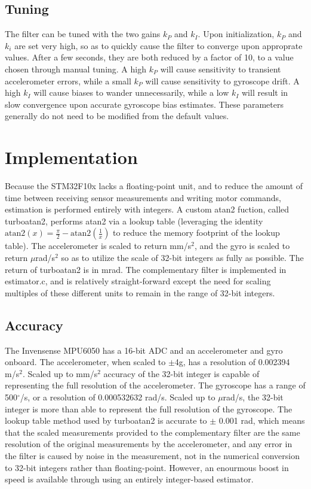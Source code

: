 \documentclass[paper=a4, fontsize=11pt]{scrartcl} %
\numberwithin{equation}{section} %
\numberwithin{figure}{section} %
\numberwithin{table}{section} %
\begin{document}
\subsection{Tuning}
The filter can be tuned with the two gains $k_P$ and $k_I$.  Upon initialization, $k_P$ and $k_i$ are set very high, so as to quickly cause the filter to converge upon approprate values.  After a few seconds, they are both reduced by a factor of 10, to a value chosen through manual tuning.  A high $k_P$ will cause sensitivity to transient accelerometer errors, while a small $k_P$ will cause sensitivity to gyroscope drift.  A high $k_I$ will cause biases to wander unnecessarily, while a low $k_I$ will result in slow convergence upon accurate gyroscope bias estimates.  These parameters generally do not need to be modified from the default values.

\section{Implementation}
Because the STM32F10x lacks a floating-point unit, and to reduce the amount of time between receiving sensor measurements and writing motor commands, estimation is performed entirely with integers.  A custom atan2 fuction, called turboatan2, performs atan2 via a lookup table (leveraging the identity $\textrm{atan2}(x) = \tfrac{\pi}{2} - \textrm{atan2}\left(\tfrac{1}{x}\right)$ to reduce the memory footprint of the lookup table).  The accelerometer is scaled to return mm/s$^2$, and the gyro is scaled to return $\mu$rad/s$^2$ so as to utilize the scale of 32-bit integers as fully as possible.  The return of turboatan2 is in mrad.  The complementary filter is implemented in estimator.c, and is relatively straight-forward except the need for scaling multiples of these different units to remain in the range of 32-bit integers.

\subsection{Accuracy}

The Invensense MPU6050 has a 16-bit ADC and an accelerometer and gyro onboard.  The accelerometer, when scaled to $\pm$4g, has a resolution of 0.002394 m/s$^2$.  Scaled up to mm/s$^2$ accuracy of the 32-bit integer is capable of representing the full resolution of the accelerometer.  The gyroscope has a range of 500$^\circ$/s, or a resolution of 0.000532632 rad/s.  Scaled up to $\mu$rad/s, the 32-bit integer is more than able to represent the full resolution of the gyroscope.  The lookup table method used by turboatan2 is accurate to $\pm$ 0.001 rad, which means that the scaled measurements provided to the complementary filter are the same resolution of the original measurements by the accelerometer, and any error in the filter is caused by noise in the measurement, not in the numerical conversion to 32-bit integers rather than floating-point.  However, an enourmous boost in speed is available through using an entirely integer-based estimator.



\end{document}
